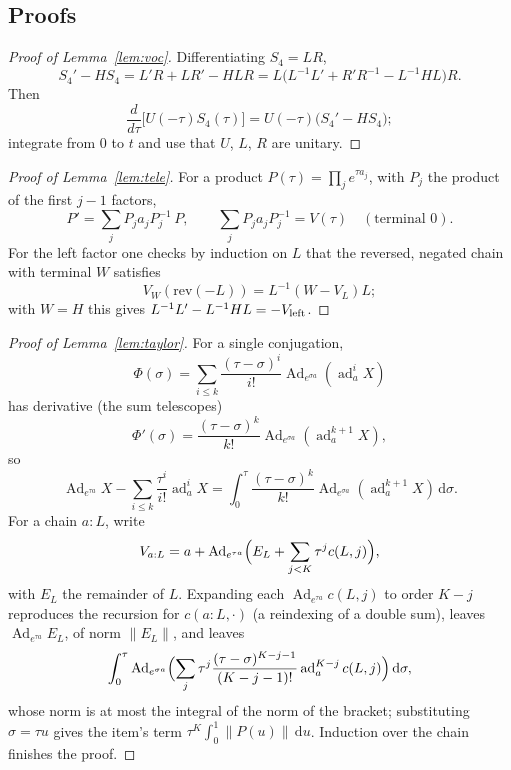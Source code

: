 \documentclass[11pt]{article}
\newcommand{\ad}{\operatorname{ad}}
\newcommand{\Ad}{\operatorname{Ad}}
\newcommand{\norm}[1]{\lVert #1\rVert}
\newcommand{\dd}{\,\mathrm{d}}
\theoremstyle{plain}
\theoremstyle{definition}
\theoremstyle{remark}
\begin{document}
\begin{appendices}
\section{Proofs}\label{app:proofs}

\begin{proof}[Proof of Lemma~\ref{lem:voc}]
Differentiating $S_4=LR$,
\[
S_4'-HS_4=L'R+LR'-HLR=L\bigl(L^{-1}L'+R'R^{-1}-L^{-1}HL\bigr)R .
\]
Then
\[
\frac{d}{d\tau}\bigl[U(-\tau)S_4(\tau)\bigr]=U(-\tau)\bigl(S_4'-HS_4\bigr);
\]
integrate from $0$ to $t$ and use that $U$, $L$, $R$ are unitary.
\end{proof}

\begin{proof}[Proof of Lemma~\ref{lem:tele}]
For a product $P(\tau)=\prod_je^{\tau a_j}$, with $P_j$ the product of the first $j-1$ factors,
\[
P'=\sum_jP_ja_jP_j^{-1}\,P,\qquad \sum_jP_ja_jP_j^{-1}=V(\tau)\quad(\text{terminal }0).
\]
For the left factor one checks by induction on $L$ that the reversed, negated chain with terminal $W$
satisfies
\[
V_W(\mathrm{rev}(-L))=L^{-1}(W-V_L)L;
\]
with $W=H$ this gives $L^{-1}L'-L^{-1}HL=-V_{\rm left}$.
\end{proof}

\begin{proof}[Proof of Lemma~\ref{lem:taylor}]
For a single conjugation,
\[\Phi(\sigma)=\sum_{i\le k}\frac{(\tau-\sigma)^i}{i!}\Ad_{e^{\sigma a}}(\ad_a^iX)\]
has derivative (the sum telescopes)
\[
\Phi'(\sigma)=\frac{(\tau-\sigma)^k}{k!}\Ad_{e^{\sigma a}}(\ad_a^{k+1}X),
\]
so
\[
\Ad_{e^{\tau a}}X-\sum_{i\le k}\frac{\tau^i}{i!}\ad_a^iX=\int_0^\tau\frac{(\tau-\sigma)^k}{k!}
\Ad_{e^{\sigma a}}(\ad_a^{k+1}X)\dd\sigma .
\]
For a chain $a{:}L$, write
\[
V_{a:L}=a+\Ad_{e^{\tau a}}\Bigl(E_L+\sum_{j<K}\tau^jc(L,j)\Bigr),
\]
with $E_L$ the remainder of $L$. Expanding each
$\Ad_{e^{\tau a}}c(L,j)$ to order $K-j$ reproduces the recursion for $c(a{:}L,\cdot)$ (a reindexing of
a double sum), leaves $\Ad_{e^{\tau a}}E_L$, of norm $\norm{E_L}$, and leaves
\[\int_0^\tau\Ad_{e^{\sigma a}}\Bigl(\sum_j\tau^j\frac{(\tau-\sigma)^{K-j-1}}{(K-j-1)!}\ad_a^{K-j}c(L,j)\Bigr)\dd\sigma,\]
whose norm is at most the integral of the norm of the bracket; substituting $\sigma=\tau u$ gives the
item's term $\tau^K\int_0^1\norm{P(u)}\dd u$. Induction over the chain finishes the proof.
\end{proof}


\end{appendices}
\end{document}
